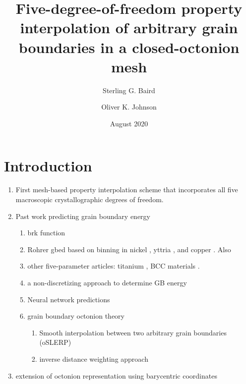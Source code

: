 \documentclass[preprint,12pt]{elsarticle}
\title{Five-degree-of-freedom property interpolation of arbitrary grain boundaries in a closed-octonion mesh}
\author{Sterling G. Baird}
\author{Oliver K. Johnson}
\date{August 2020}
\begin{document}
\begin{abstract}
    
\end{abstract}

\maketitle

\section{Introduction}

\begin{enumerate}
    \item First mesh-based property interpolation scheme that incorporates all five macroscopic crystallographic degrees of freedom.
    \item Past work predicting grain boundary energy
    \begin{enumerate}
        \item \gls{brk} function \cite{Bulatov2014GrainMetals}
        \item Rohrer \gls{gbed} based on binning in nickel \cite{Li2009RelativeNickel}, yttria \cite{Dillon2009CharacterizationFIB}, and copper \cite{Randle2008Five-parameterCopper}. Also \cite{Rohrer2010DerivingData}
        \item other five-parameter articles: titanium \cite{Farabi2018Five-parameterTitanium}, BCC materials \cite{Ratanaphan2015GrainMetals}.
        \item a non-discretizing approach to determine GB energy \cite{Shen2019DeterminingSpace}
        \item Neural network predictions \cite{EcheverriRestrepo2014UsingEnergies}
        \item grain boundary octonion theory \cite{Francis2019ABoundaries,Chesser2020LearningProperties}
         \begin{enumerate}
             \item Smooth interpolation between two arbitrary grain boundaries (oSLERP) \cite{Francis2019ABoundaries}
             \item inverse distance weighting approach \cite{Chesser2020LearningProperties}
         \end{enumerate}
    \end{enumerate}
    \item extension of octonion representation using barycentric coordinates
    \begin{enumerate}

\end{enumerate}
\end{enumerate}
\end{document}

